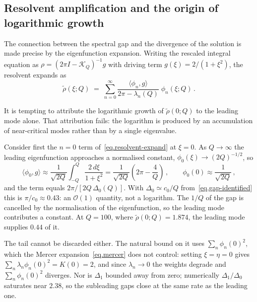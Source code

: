 \documentclass[11pt,a4paper]{article}
\theoremstyle{definition}
\begin{document}
\subsection{Resolvent amplification and the origin of logarithmic growth}
\label{subsec.resolvent}

The connection between the spectral gap and the divergence of the solution
is made precise by the eigenfunction expansion. Writing the rescaled integral
equation as $\rho = (2\pi I - \mathcal{K}_Q)^{-1} g$ with driving term
$g(\xi) = 2/(1+\xi^2)$, the resolvent expands as
\begin{equation}\label{eq.resolvent-expand}
  \tilde\rho(\xi;Q)
  \;=\;
  \sum_{n=0}^{\infty}
  \frac{\langle \phi_n, g \rangle}{2\pi - \lambda_n(Q)}\;
  \phi_n(\xi;Q)\,.
\end{equation}

It is tempting to attribute the logarithmic growth of $\tilde\rho(0;Q)$ to the
leading mode alone.  That attribution fails: the logarithm is produced by an
accumulation of near-critical modes rather than by a single eigenvalue.

Consider first the $n=0$ term of~\eqref{eq.resolvent-expand} at $\xi=0$.  As
$Q\to\infty$ the leading eigenfunction approaches a normalised constant,
$\phi_0(\xi) \to (2Q)^{-1/2}$, so
\begin{equation}\label{eq.mode0-projection}
  \langle \phi_0, g\rangle
  \approx
  \frac{1}{\sqrt{2Q}} \int_{-Q}^{Q} \frac{2\,d\xi}{1+\xi^2}
  = \frac{1}{\sqrt{2Q}}\left(2\pi - \frac{4}{Q}\right)\,,
  \qquad \phi_0(0) \approx \frac{1}{\sqrt{2Q}}\,,
\end{equation}
and the term equals $2\pi/[2Q\,\Delta_0(Q)]$.  With
$\Delta_0 \simeq c_0/Q$ from~\eqref{eq.gap-identified} this is
$\pi/c_0 \approx 0.43$: an $\mathcal O(1)$ quantity, not a logarithm.  The $1/Q$
of the gap is cancelled by the normalisation of the eigenfunction, so the
leading mode contributes a constant.  At $Q = 100$, where
$\tilde\rho(0;Q) = 1.874$, the leading mode supplies $0.44$ of it.

The tail cannot be discarded either.  The natural bound on it uses
$\sum_n \phi_n(0)^2$, which the Mercer expansion~\eqref{eq.mercer} does not
control: setting $\xi=\eta=0$ gives $\sum_n \lambda_n \phi_n(0)^2 = K(0) = 2$,
and since $\lambda_n \to 0$ the weights degrade and $\sum_n \phi_n(0)^2$
diverges.  Nor is $\Delta_1$ bounded away from zero; numerically
$\Delta_1/\Delta_0$ saturates near $2.38$, so the subleading gaps close at the
same rate as the leading one.
\end{document}
